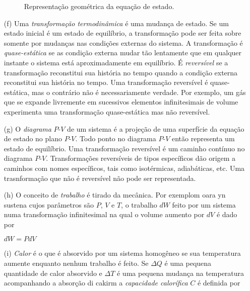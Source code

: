 \begin{itemize}
\begin{figure}[h]
\begin{center}
\renewcommand{\figurename}{Fig.}
\caption{Representa\c{c}\~ao geom\'etrica da equa\c{c}\~ao de estado.}
\label{figC01_001}
\end{center}
\end{figure}
\item[(f)] Uma {\it transforma\c{c}\~ao termodin\^amica} \'e uma mudan\c{c}a de estado. Se um estado inicial \'e um estado de equil\'ibrio, a transforma\c{c}\~ao pode ser feita sobre somente por mudan\c{c}as nas condi\c{c}\~oes externas do sistema. A transforma\c{c}\~ao \'e {\it quase-est\'atica} se as condi\c{c}\~ao externa mudar t\~ao lentamente que em qualquer instante o sistema est\'a aproximadamente em equil\'ibrio. \'E {\it revers\'ivel} se a transforma\c{c}\~ao reconstitui sua hist\'oria no tempo quando a condi\c{c}\~ao externa reconstitui sua hist\'oria no tempo. Uma transforma\c{c}\~ao revers\'ivel \'e quase-est\'atica, mas o contr\'ario n\~ao \'e necessariamente verdade. Por exemplo, um g\'as que se expande livremente em sucessivos elementos infinitesimais de volume experimenta uma transforma\c{c}\~ao quase-est\'atica mas n\~ao revers\'ivel.
\item[(g)] O {\it diagrama} $P$-$V$ de um sistema \'e a proje\c{c}\~ao de uma superf\'icie da equa\c{c}\~ao de estado no plano $P$-$V$. Todo ponto no diagrama $P$-$V$ ent\~ao representa um estado de equil\'ibrio. Uma transforma\c{c}\~ao revers\'ivel \'e um caminho cont\'inuo no diagrama $P$-$V$. Transforma\c{c}\~oes revers\'iveis de tipos espec\'ificos d\~ao origem a caminhos com nomes espec\'ificos, tais como isot\'ermicas, adiab\'aticas, etc. Uma trasnforma\c{c}\~ao que n\~ao \'e revers\'ivel n\~ao pode ser representada.
\item[(h)] O conceito de {\it trabalho} \'e tirado da mec\^anica. Por exemplom oara yn sustena cujos par\^ametros s\~ao $P$, $V$ e $T$, o trabalho $dW$ feito por um sistema numa transforma\c{c}\~ao infinitesimal na qual o volume aumento por $dV$ \'e dado por
\begin{center}
$dW=PdV$
\end{center}
\item[(i)] {\it Calor} \'e o que \'e absorvido por um sistema homog\^eneo se sua temperatura aumente enquanto nenhum trabalho \'e feito. Se $\Delta Q$ \'e uma pequena quantidade de calor absorvido e $\Delta T$ \'e uma pequena mudan\c{c}a na temperatura acompanhando a absor\c{c}\~ao di cakirm a {\it capacidade calor\'ifica} $C$ \'e definida por

\end{itemize}
